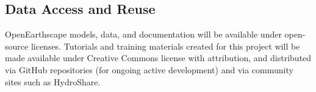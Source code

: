 \subsection*{Data Access and Reuse}

OpenEarthscape models, data, and documentation will be available under open-source licenses. Tutorials and training materials created for this project will be made available under Creative Commons license with attribution, and distributed via GitHub repositories (for ongoing active development) and via community sites such as HydroShare.


